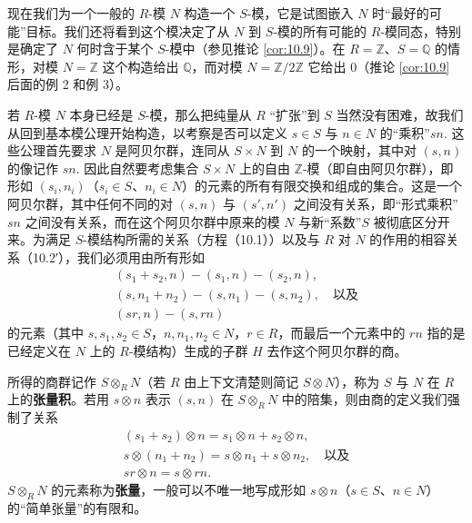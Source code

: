 现在我们为一个一般的 \(R\)-模 \(N\) 构造一个 \(S\)-模，它是试图嵌入 \(N\) 时“最好的可能”目标。我们还将看到这个模决定了从 \(N\) 到 \(S\)-模的所有可能的 \(R\)-模同态，特别是确定了 \(N\) 何时含于某个 \(S\)-模中（参见推论 \ref{cor:10.9}）。在 \(R = \mathbb{Z}\)、\(S = \mathbb{Q}\) 的情形，对模 \(N = \mathbb{Z}\) 这个构造给出 \(\mathbb{Q}\)，而对模 \(N = \mathbb{Z}/2\mathbb{Z}\) 它给出 0（推论 \ref{cor:10.9} 后面的例 2 和例 3）。

若 \(R\)-模 \(N\) 本身已经是 \(S\)-模，那么把纯量从 \(R\) “扩张”到 \(S\) 当然没有困难，故我们从回到基本模公理开始构造，以考察是否可以定义 \(s \in S\) 与 \(n \in N\) 的“乘积”\(sn\). 这些公理首先要求 \(N\) 是阿贝尔群，连同从 \(S \times N\) 到 \(N\) 的一个映射，其中对 \((s, n)\) 的像记作 \(sn\). 因此自然要考虑集合 \(S \times N\) 上的自由 \(\mathbb{Z}\)-模（即自由阿贝尔群），即形如 \((s_i, n_i)\)（\(s_i \in S\)、\(n_i \in N\)）的元素的所有有限交换和组成的集合。这是一个阿贝尔群，其中任何不同的对 \((s, n)\) 与 \((s', n')\) 之间没有关系，即“形式乘积”\(sn\) 之间没有关系，而在这个阿贝尔群中原来的模 \(N\) 与新“系数”\(S\) 被彻底区分开来。为满足 \(S\)-模结构所需的关系（方程（10.1））以及与 \(R\) 对 \(N\) 的作用的相容关系（10.2′），我们必须用由所有形如
\begin{equation}
\begin{gathered}
(s_1+s_2, n)-(s_1, n)-(s_2, n), \\
(s, n_1+n_2)-(s, n_1)-(s, n_2), \quad \text{以及} \\
(sr, n)-(s, rn)
\end{gathered}\tag{10.3}
\end{equation}
的元素（其中 \(s, s_1, s_2 \in S\)，\(n, n_1, n_2 \in N\)，\(r \in R\)，而最后一个元素中的 \(rn\) 指的是已经定义在 \(N\) 上的 \(R\)-模结构）生成的子群 \(H\) 去作这个阿贝尔群的商。

所得的商群记作 \(S \otimes_R N\)（若 \(R\) 由上下文清楚则简记 \(S \otimes N\)），称为 \(S\) 与 \(N\) 在 \(R\) 上的\textbf{张量积}。若用 \(s \otimes n\) 表示 \((s, n)\) 在 \(S \otimes_R N\) 中的陪集，则由商的定义我们强制了关系
\begin{equation}
\begin{gathered}
(s_1+s_2) \otimes n = s_1 \otimes n + s_2 \otimes n, \\
s \otimes (n_1+n_2) = s \otimes n_1 + s \otimes n_2, \quad \text{以及} \\
sr \otimes n = s \otimes rn.
\end{gathered}\tag{10.4}
\end{equation}
\(S \otimes_R N\) 的元素称为\textbf{张量}，一般可以不唯一地写成形如 \(s \otimes n\)（\(s \in S\)、\(n \in N\)）的“简单张量”的有限和。

